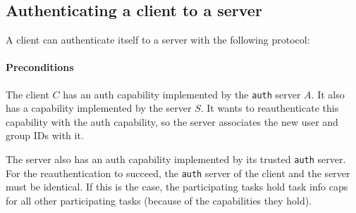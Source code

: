 \documentclass[9pt,a4paper]{extarticle}
\begin{document}
\subsection{Authenticating a client to a server}

A client can authenticate itself to a server with the following
protocol:

\paragraph{Preconditions}
The client $C$ has an auth capability implemented by the \texttt{auth}
server $A$.  It also has a capability implemented by the server $S$.
It wants to reauthenticate this capability with the auth capability,
so the server associates the new user and group IDs with it.

The server also has an auth capability implemented by its trusted
\texttt{auth} server.  For the reauthentication to succeed, the
\texttt{auth} server of the client and the server must be identical.
If this is the case, the participating tasks hold task info caps for
all other participating tasks (because of the capabilities they hold).
\end{document}
